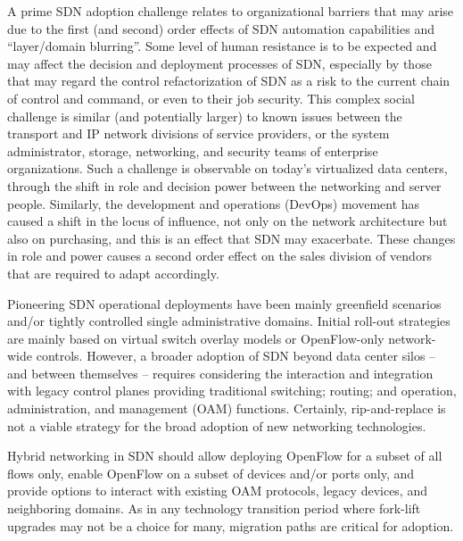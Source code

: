 A prime SDN adoption challenge relates to organizational barriers that may arise due to the first (and second) order 
effects of SDN automation capabilities and ``layer/domain blurring''. 
Some level of human resistance is to be expected and may affect the decision and deployment processes of SDN, especially by those that may regard the 
control refactorization of SDN as a risk to the current chain of control and command, or even to their job security. 
This complex social challenge is similar (and potentially larger) to known issues between the transport and IP 
network divisions of service providers, or the system administrator, storage, networking, and security teams 
of enterprise organizations. Such a challenge is observable on today's virtualized data centers, through the shift 
in role and decision power between the networking and server people. Similarly, the development and operations (DevOps) movement has caused a shift in the locus of influence, not only 
on the network architecture but also on purchasing, and this is an effect that SDN may exacerbate. These changes in role and power causes a second order effect on the sales division of vendors that are required to adapt accordingly. 


Pioneering SDN operational deployments have been mainly greenfield scenarios and/or tightly controlled single 
administrative domains. Initial roll-out strategies are mainly based on virtual switch overlay models or 
OpenFlow-only network-wide controls. However, a broader adoption of SDN beyond data center silos -- and 
between themselves -- requires considering the interaction and integration with legacy control planes providing 
traditional switching; routing; and operation, administration, and management (OAM) functions. Certainly, 
rip-and-replace is not a viable strategy for the broad adoption of new networking technologies.

Hybrid networking in SDN should allow deploying OpenFlow for a subset of all flows only, enable OpenFlow on 
a subset of devices and/or ports only, and provide options to 
interact with existing OAM protocols, legacy devices, and neighboring domains. As in any technology transition 
period where fork-lift upgrades may not be a choice for many, migration paths are critical for 
adoption.

